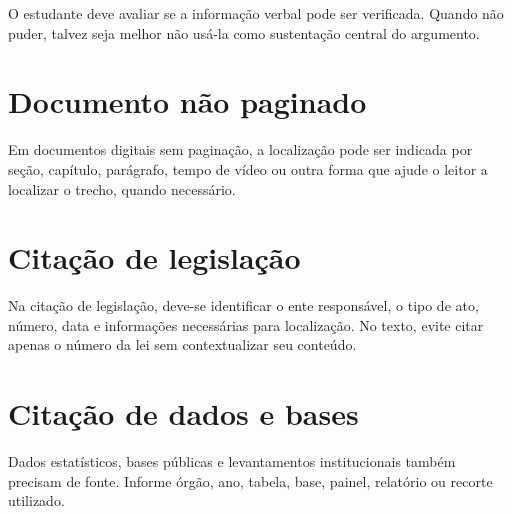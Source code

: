 O estudante deve avaliar se a informação verbal pode ser verificada. Quando não puder, talvez seja melhor não usá-la como sustentação central do argumento.

\section{Documento não paginado}

Em documentos digitais sem paginação, a localização pode ser indicada por seção, capítulo, parágrafo, tempo de vídeo ou outra forma que ajude o leitor a localizar o trecho, quando necessário.

\section{Citação de legislação}

Na citação de legislação, deve-se identificar o ente responsável, o tipo de ato, número, data e informações necessárias para localização. No texto, evite citar apenas o número da lei sem contextualizar seu conteúdo.

\section{Citação de dados e bases}

Dados estatísticos, bases públicas e levantamentos institucionais também precisam de fonte. Informe órgão, ano, tabela, base, painel, relatório ou recorte utilizado.

